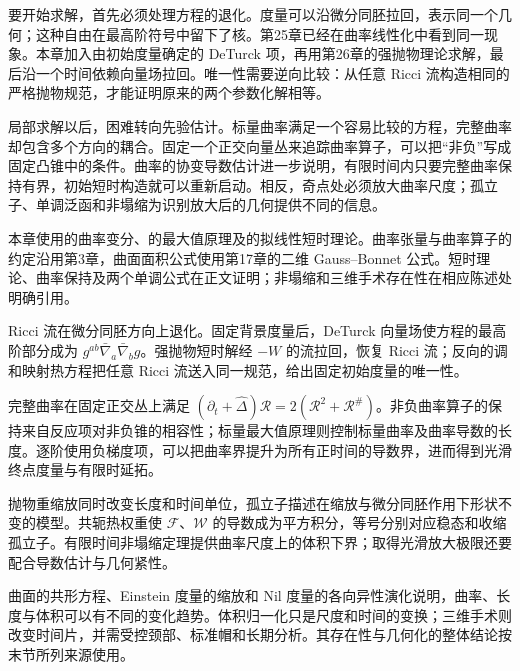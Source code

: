\ProseParagraphBreak
要开始求解，首先必须处理方程的退化。度量可以沿微分同胚拉回，表示同一个几何；这种自由在最高阶符号中留下了核。第25章已经在曲率线性化中看到同一现象。本章加入由初始度量确定的 DeTurck 项，再用第26章的强抛物理论求解，最后沿一个时间依赖向量场拉回。唯一性需要逆向比较：从任意 Ricci 流构造相同的严格抛物规范，才能证明原来的两个参数化解相等。

\ProseParagraphBreak
局部求解以后，困难转向先验估计。标量曲率满足一个容易比较的方程，完整曲率却包含多个方向的耦合。固定一个正交向量丛来追踪曲率算子，可以把“非负”写成固定凸锥中的条件。曲率的协变导数估计进一步说明，有限时间内只要完整曲率保持有界，初始短时构造就可以重新启动。相反，奇点处必须放大曲率尺度；孤立子、单调泛函和非塌缩为识别放大后的几何提供不同的信息。

\ProseParagraphBreak
本章使用的曲率变分、的最大值原理及的拟线性短时理论。曲率张量与曲率算子的约定沿用第3章，曲面面积公式使用第17章的二维 Gauss--Bonnet 公式。短时理论、曲率保持及两个单调公式在正文证明；非塌缩和三维手术存在性在相应陈述处明确引用。







\begin{chaptersummary}
Ricci 流在微分同胚方向上退化。固定背景度量后，DeTurck 向量场使方程的最高阶部分成为 \(g^{ab}\bar\nabla_a\bar\nabla_b g\)。强抛物短时解经 \(-W\) 的流拉回，恢复 Ricci 流；反向的调和映射热方程把任意 Ricci 流送入同一规范，给出固定初始度量的唯一性。

\ProseParagraphBreak
完整曲率在固定正交丛上满足 \((\partial_t+\widehat\Delta)\mathcal R=2(\mathcal R^2+\mathcal R^\#)\)。非负曲率算子的保持来自反应项对非负锥的相容性；标量最大值原理则控制标量曲率及曲率导数的长度。逐阶使用负梯度项，可以把曲率界提升为所有正时间的导数界，进而得到光滑终点度量与有限时延拓。

\ProseParagraphBreak
抛物重缩放同时改变长度和时间单位，孤立子描述在缩放与微分同胚作用下形状不变的模型。共轭热权重使 \(\mathcal F\)、\(\mathcal W\) 的导数成为平方积分，等号分别对应稳态和收缩孤立子。有限时间非塌缩定理提供曲率尺度上的体积下界；取得光滑放大极限还要配合导数估计与几何紧性。

\ProseParagraphBreak
曲面的共形方程、Einstein 度量的缩放和 Nil 度量的各向异性演化说明，曲率、长度与体积可以有不同的变化趋势。体积归一化只是尺度和时间的变换；三维手术则改变时间片，并需受控颈部、标准帽和长期分析。其存在性与几何化的整体结论按末节所列来源使用。
\end{chaptersummary}

